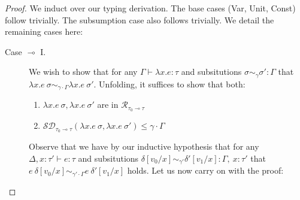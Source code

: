 \begin{proof}
  We induct over our typing derivation. The base cases (Var, Unit, Const) follow
  trivially. The subsumption case also follows trivially. We detail the
  remaining cases here:
  \begin{description}
    \item[Case $\multimap$ I.] 
      We wish to show that for any $\Gamma \vdash \lambda x . e : \tau$ and
      subsitutions $\sigma \sim_{\gamma} \sigma' : \Gamma$ that $\lambda x .
      e~\sigma \sim_{\gamma \cdot \Gamma} \lambda x . e~\sigma'$. Unfolding, it
      suffices to show that both:
      \begin{enumerate}
        \item $\lambda x . e~\sigma, \lambda x . e~\sigma'$ are in
          $\mathcal{R}_{\tau_0 \multimap \tau}$
        \item $\mathcal{SD}_{\tau_0 \multimap \tau}(\lambda x . e~\sigma,
          \lambda x . e~\sigma') \leq \gamma \cdot \Gamma$
      \end{enumerate}
    
      Observe that we have by our inductive hypothesis that for any $\Delta, x:
      \tau' \vdash e : \tau$ and subsitutions 
      $\delta[v_0/x] \sim_{\gamma'} \delta'[v_1/x] : \Gamma,~x : \tau'$ that 
      $e~\delta[v_0/x] \sim_{\gamma' \cdot \Gamma} e~\delta'[v_1/x]$ holds. 
      Let us now carry on with the proof:


\end{description}
\end{proof}
